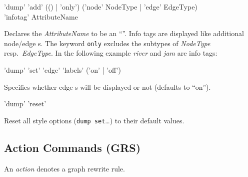 \begin{rail}
  'dump' 'add' (() | 'only') ('node' NodeType | 'edge' EdgeType) \\ 'infotag' AttributeName
\end{rail}
Declares the  \emph{AttributeName} to be an ``''. Info tags are displayed like additional node/edge s. The keyword \texttt{only} excludes the subtypes of \emph{NodeType} resp.\ \emph{EdgeType}. In the following example \emph{river} and \emph{jam} are info tags:
\begin{center}
\end{center}


\begin{rail}
  'dump' 'set' 'edge' 'labels' ('on' | 'off')
\end{rail}
Specifies whether edge s will be displayed or not (defaults to ``on'').

\begin{rail}
  'dump' 'reset'
\end{rail}
Reset all style options (\texttt{dump set}\dots) to their default values.

\subsection{Action Commands (GRS)}
\label{grsthings}
An \emph{action} denotes a graph rewrite rule.

